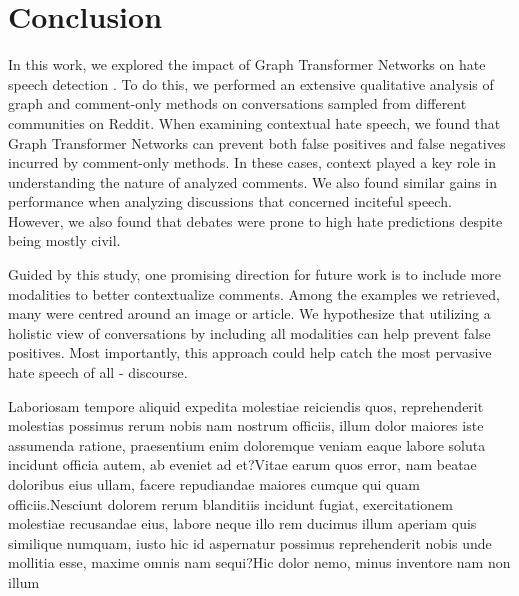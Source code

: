 \documentclass[letterpaper]{article} %
\begin{document}
\vspace{-1.51mm}
\section{Conclusion}
In this work, we explored the impact of Graph Transformer Networks on hate speech detection \cite{hebert2022predicting}. To do this, we performed an extensive qualitative analysis of graph and comment-only methods on conversations sampled from different communities on Reddit. When examining contextual hate speech, we found that Graph Transformer Networks can prevent both false positives and false negatives incurred by comment-only methods. In these cases, context played a key role in understanding the nature of analyzed comments. We also found similar gains in performance when analyzing discussions that concerned inciteful speech. However, we also found that debates were prone to high hate predictions despite being mostly civil.

Guided by this study, one promising direction for future work is to include more modalities to better contextualize comments. Among the examples we retrieved, many were centred around an image or article. We hypothesize that utilizing a holistic view of conversations by including all modalities can help prevent false positives. Most importantly, this approach could help catch the most pervasive hate speech of all - discourse.


Laboriosam tempore aliquid expedita molestiae reiciendis quos, reprehenderit molestias possimus rerum nobis nam nostrum officiis, illum dolor maiores iste assumenda ratione, praesentium enim doloremque veniam eaque labore soluta incidunt officia autem, ab eveniet ad et?Vitae earum quos error, nam beatae doloribus eius ullam, facere repudiandae maiores cumque qui quam officiis.Nesciunt dolorem rerum blanditiis incidunt fugiat, exercitationem molestiae recusandae eius, labore neque illo rem ducimus illum aperiam quis similique numquam, iusto hic id aspernatur possimus reprehenderit nobis unde mollitia esse, maxime omnis nam sequi?Hic dolor nemo, minus inventore nam non illum

\end{document}
